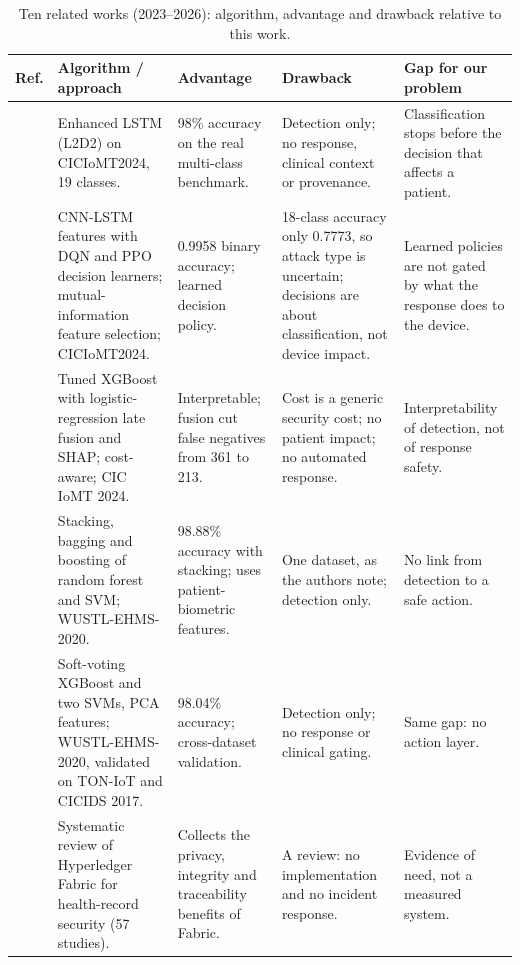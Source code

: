\documentclass[preprint,12pt]{elsarticle}
\begin{document}
\begin{table}[htbp]
\centering
\caption{Ten related works (2023--2026): algorithm, advantage and drawback relative to this work.}
\label{tab:lit}
\footnotesize
\begin{tabular}{@{}C{0.8cm}L{2.9cm}L{3.0cm}L{3.1cm}L{2.9cm}@{}}
\toprule
Ref. & Algorithm / approach & Advantage & Drawback & Gap for our problem \\
\midrule
\cite{akar2025} & Enhanced LSTM (L2D2) on CICIoMT2024, 19 classes. & 98\% accuracy on the real multi-class benchmark. & Detection only; no response, clinical context or provenance. & Classification stops before the decision that affects a patient. \\
\cite{shaikh2025} & CNN-LSTM features with DQN and PPO decision learners; mutual-information feature selection; CICIoMT2024. & 0.9958 binary accuracy; learned decision policy. & 18-class accuracy only 0.7773, so attack type is uncertain; decisions are about classification, not device impact. & Learned policies are not gated by what the response does to the device. \\
\cite{hafid2025} & Tuned XGBoost with logistic-regression late fusion and SHAP; cost-aware; CIC IoMT 2024. & Interpretable; fusion cut false negatives from 361 to 213. & Cost is a generic security cost; no patient impact; no automated response. & Interpretability of detection, not of response safety. \\
\cite{alsolami2024} & Stacking, bagging and boosting of random forest and SVM; WUSTL-EHMS-2020. & 98.88\% accuracy with stacking; uses patient-biometric features. & One dataset, as the authors note; detection only. & No link from detection to a safe action. \\
\cite{abdelhaq2026} & Soft-voting XGBoost and two SVMs, PCA features; WUSTL-EHMS-2020, validated on TON-IoT and CICIDS 2017. & 98.04\% accuracy; cross-dataset validation. & Detection only; no response or clinical gating. & Same gap: no action layer. \\
\cite{hasnain2023} & Systematic review of Hyperledger Fabric for health-record security (57 studies). & Collects the privacy, integrity and traceability benefits of Fabric. & A review: no implementation and no incident response. & Evidence of need, not a measured system. \\

\end{tabular}
\end{table}
\end{document}
